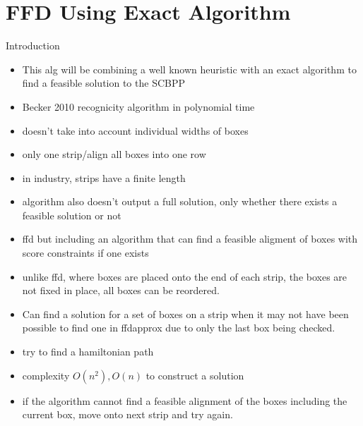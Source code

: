 \documentclass[oribibl]{llncs}
\begin{document}
\section{FFD Using Exact Algorithm}
\label{sec:ffdexact}
Introduction
\begin{itemize}
	\item This alg will be combining a well known heuristic with an exact algorithm to find a feasible solution to the SCBPP
	\item Becker 2010 recognicity algorithm in polynomial time
	\item doesn't take into account individual widths of boxes
	\item only one strip/align all boxes into one row
	\item in industry, strips have a finite length
	\item algorithm also doesn't output a full solution, only whether there exists a feasible solution or not
	\item ffd but including an algorithm that can find a feasible aligment of boxes with score constraints if one exists
	\item unlike ffd, where boxes are placed onto the end of each strip, the boxes are not fixed in place, all boxes can be reordered.
	\item Can find a solution for a set of boxes on a strip when it may not have been possible to find one in ffdapprox due to only the last box being checked.
	\item try to find a hamiltonian path 
	\item complexity $O(n^2), O(n)$ to construct a solution
	\item if the algorithm cannot find a feasible alignment of the boxes including the current box, move onto next strip and try again.
\end{itemize}
\end{document}
